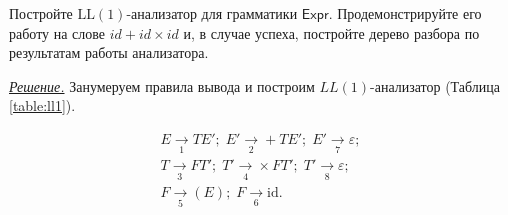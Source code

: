 \documentclass[10pt]{article}
\newcounter{pr} \setcounter{pr}{0}
\newenvironment{sol}
  {\par
   {\itshape \underline{Решение.}}}
  {}
\newcommand{\eps}{\varepsilon}
\newcommand{\id}{\mathrm{id}}
\newcommand{\LL}{\mathrm{LL}}
\begin{document}
  \begin{pr}
    Постройте $\LL(1)$-анализатор для грамматики $\mathsf{Expr}$.
    Продемонстрируйте его работу на слове $id + id \times id$ и, в случае
    успеха, постройте дерево разбора по результатам работы анализатора.
    \begin{sol}
      Занумеруем правила вывода и построим $LL(1)$-анализатор
      (Таблица \ref{table:ll1}).
      \begin{multicols}{2}
        \begin{minipage}{.9\linewidth}
          \centering
          \vspace{0.5cm}
          \begin{gather*}
            E \xrightarrow[1]{} TE';\; E' \xrightarrow[2]{} + TE';\;
              E' \xrightarrow[7]{} \eps; \\
            T \xrightarrow[3]{} FT';\; T' \xrightarrow[4]{} \times FT';\;
              T' \xrightarrow[8]{} \eps; \\
            F \xrightarrow[5]{} (E);\; F \xrightarrow[6]{} \id.
          \end{gather*}
        \end{minipage}

        \columnbreak


\end{multicols}
\end{sol}
\end{pr}
\end{document}
